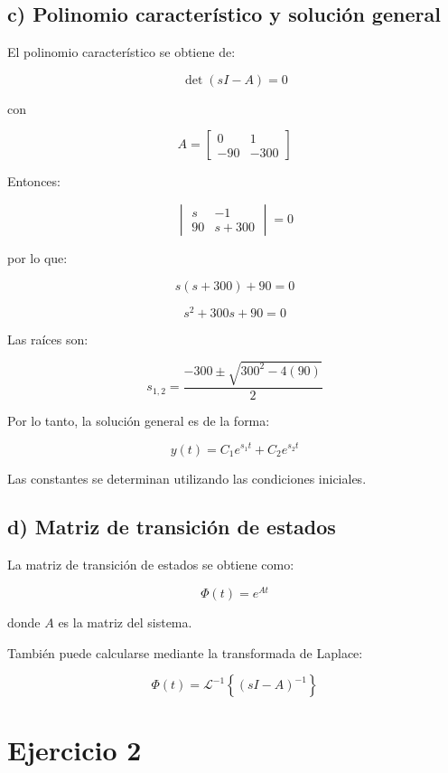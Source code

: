 \documentclass[12pt,a4paper]{article}
\begin{document}
\subsection*{c) Polinomio característico y solución general}

El polinomio característico se obtiene de:

\[
\det(sI-A)=0
\]

con

\[
A=
\begin{bmatrix}
0 & 1\\
-90 & -300
\end{bmatrix}
\]

Entonces:

\[
\begin{vmatrix}
s & -1\\
90 & s+300
\end{vmatrix}
=0
\]

por lo que:

\[
s(s+300)+90=0
\]

\[
s^2+300s+90=0
\]

Las raíces son:

\[
s_{1,2}
=
\frac{-300\pm\sqrt{300^2-4(90)}}{2}
\]

Por lo tanto, la solución general es de la forma:

\[
y(t)=C_1e^{s_1t}+C_2e^{s_2t}
\]

Las constantes se determinan utilizando las condiciones iniciales.

\subsection*{d) Matriz de transición de estados}

La matriz de transición de estados se obtiene como:

\[
\Phi(t)=e^{At}
\]

donde $A$ es la matriz del sistema.

También puede calcularse mediante la transformada de Laplace:

\[
\Phi(t)
=
\mathcal{L}^{-1}
\left\{
(sI-A)^{-1}
\right\}
\]

\newpage


\section*{Ejercicio 2}
\end{document}
